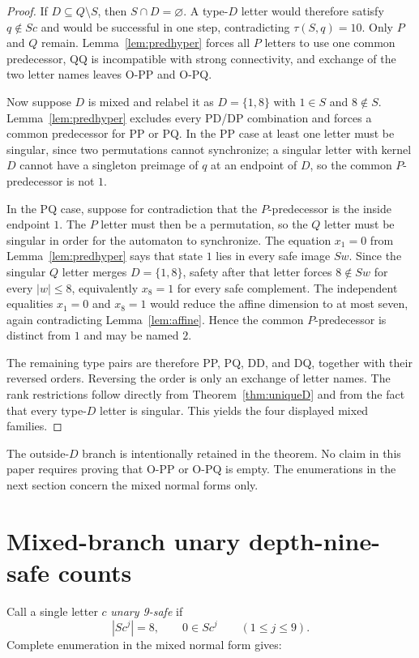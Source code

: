 \documentclass[11pt]{article}
\theoremstyle{definition}
\theoremstyle{remark}
\begin{document}
\begin{proof}
If $D\subseteq Q\setminus S$, then $S\cap D=\varnothing$. A type-$D$ letter would therefore satisfy $q\notin Sc$ and would be successful in one step, contradicting $\tau(S,q)=10$. Only $P$ and $Q$ remain. Lemma~\ref{lem:predhyper} forces all $P$ letters to use one common predecessor, QQ is incompatible with strong connectivity, and exchange of the two letter names leaves O-PP and O-PQ.

Now suppose $D$ is mixed and relabel it as $D=\{1,8\}$ with $1\in S$ and $8\notin S$. Lemma~\ref{lem:predhyper} excludes every PD/DP combination and forces a common predecessor for PP or PQ. In the PP case at least one letter must be singular, since two permutations cannot synchronize; a singular letter with kernel $D$ cannot have a singleton preimage of $q$ at an endpoint of $D$, so the common $P$-predecessor is not $1$.

In the PQ case, suppose for contradiction that the $P$-predecessor is the inside endpoint $1$. The $P$ letter must then be a permutation, so the $Q$ letter must be singular in order for the automaton to synchronize. The equation $x_1=0$ from Lemma~\ref{lem:predhyper} says that state $1$ lies in every safe image $Sw$. Since the singular $Q$ letter merges $D=\{1,8\}$, safety after that letter forces $8\notin Sw$ for every $|w|\le8$, equivalently $x_8=1$ for every safe complement. The independent equalities $x_1=0$ and $x_8=1$ would reduce the affine dimension to at most seven, again contradicting Lemma~\ref{lem:affine}. Hence the common $P$-predecessor is distinct from $1$ and may be named $2$.

The remaining type pairs are therefore PP, PQ, DD, and DQ, together with their reversed orders. Reversing the order is only an exchange of letter names. The rank restrictions follow directly from Theorem~\ref{thm:uniqueD} and from the fact that every type-$D$ letter is singular. This yields the four displayed mixed families.
\end{proof}

The outside-$D$ branch is intentionally retained in the theorem. No claim in this paper requires proving that O-PP or O-PQ is empty. The enumerations in the next section concern the mixed normal forms only.

\section{Mixed-branch unary depth-nine-safe counts}
Call a single letter $c$ \emph{unary 9-safe} if
\[
|Sc^j|=8,\qquad 0\in Sc^j\qquad(1\le j\le9).
\]
Complete enumeration in the mixed normal form gives:
\end{document}
